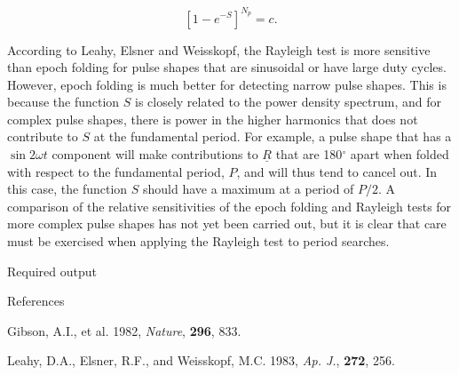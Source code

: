 $$[1 - e^{-S}]^{N_p} = c.$$

According to Leahy, Elsner and Weisskopf, the Rayleigh test is more sensitive
than epoch folding for pulse shapes that are sinusoidal or have large duty
cycles.  However, epoch folding is much better for detecting narrow pulse
shapes.  This is because the function $S$ is closely related to the power density
spectrum, and for complex pulse shapes, there is power in the higher harmonics
that does not contribute to $S$ at the fundamental period.  For example, a pulse
shape that has a $\sin 2\omega t$ component will make contributions to 
$\underline{R}$ that are
180$^{\circ}$ apart when folded with respect to the fundamental period, $P$, and
will thus tend to cancel out.  In this case, the function $S$ should have a
maximum at a period of $P/2$.  A comparison of the relative sensitivities of the
epoch folding and Rayleigh tests for more complex pulse shapes has not yet
been carried out, but it is clear that care must be exercised when applying
the Rayleigh test to period searches.

\@{Required output}





\@{References}

Gibson, A.I., et al. 1982, {\it Nature}, {\bf 296}, 833.

Leahy, D.A., Elsner, R.F., and Weisskopf, M.C. 1983, {\it Ap. J.},
{\bf 272}, 256.


\vfill\eject
